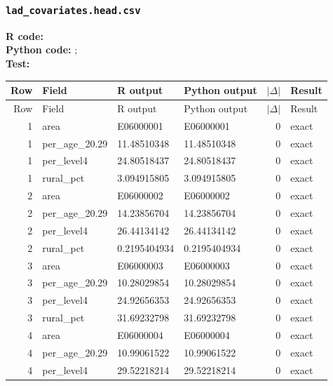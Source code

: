 \documentclass[10pt]{article}
\begin{document}
\subsubsection{\texorpdfstring{\texttt{lad\_covariates.head.csv}}{lad\_covariates.head.csv}}
{\footnotesize \textbf{R code:} \\ \textbf{Python code:} ; \\ \textbf{Test:} \par}

\small
\begin{longtable}{@{}r p{}p{}p{}rl@{}}
\toprule
Row & Field & R output & Python output & $|\Delta|$ & Result \\
\midrule
\endfirsthead
\toprule
Row & Field & R output & Python output & $|\Delta|$ & Result \\
\midrule
\endhead
1 & area & E06000001 & E06000001 & 0 & exact \\
1 & per\_\allowbreak{}age\_\allowbreak{}20.29 & 11.48510348 & 11.48510348 & 0 & exact \\
1 & per\_\allowbreak{}level4 & 24.80518437 & 24.80518437 & 0 & exact \\
1 & rural\_\allowbreak{}pct & 3.094915805 & 3.094915805 & 0 & exact \\
2 & area & E06000002 & E06000002 & 0 & exact \\
2 & per\_\allowbreak{}age\_\allowbreak{}20.29 & 14.23856704 & 14.23856704 & 0 & exact \\
2 & per\_\allowbreak{}level4 & 26.44134142 & 26.44134142 & 0 & exact \\
2 & rural\_\allowbreak{}pct & 0.2195404934 & 0.2195404934 & 0 & exact \\
3 & area & E06000003 & E06000003 & 0 & exact \\
3 & per\_\allowbreak{}age\_\allowbreak{}20.29 & 10.28029854 & 10.28029854 & 0 & exact \\
3 & per\_\allowbreak{}level4 & 24.92656353 & 24.92656353 & 0 & exact \\
3 & rural\_\allowbreak{}pct & 31.69232798 & 31.69232798 & 0 & exact \\
4 & area & E06000004 & E06000004 & 0 & exact \\
4 & per\_\allowbreak{}age\_\allowbreak{}20.29 & 10.99061522 & 10.99061522 & 0 & exact \\
4 & per\_\allowbreak{}level4 & 29.52218214 & 29.52218214 & 0 & exact \\

\end{longtable}
\end{document}
